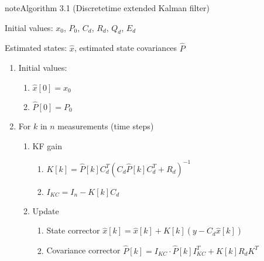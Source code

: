 \documentclass[review]{elsarticle}
\begin{document}
\begin{sphinxadmonition}{note}{Algorithm 3.1 (Discrete\sphinxhyphen{}time extended Kalman filter)}



\sphinxAtStartPar
{} Initial values: \(x_0\), \(P_0\), \(C_d\), \(R_d\), \(Q_d\), \(E_d\)

\sphinxAtStartPar
{} Estimated states: \(\hat{x}\), estimated state covariances \(\hat{P}\)
\begin{enumerate}
%
\item {} 
\sphinxAtStartPar
Initial values:
\begin{enumerate}
%
\item {} 
\sphinxAtStartPar
\(\hat{x}[0] = x_0\)

\item {} 
\sphinxAtStartPar
\(\hat{P}[0] = P_0\)

\end{enumerate}

\item {} 
\sphinxAtStartPar
For \(k\) in \(n\) measurements (time steps)
\begin{enumerate}
%
\item {} 
\sphinxAtStartPar
KF gain
\begin{enumerate}
%
\item {} 
\sphinxAtStartPar
\(K[k]=\hat{P}[k] C_d^T \left(C_d \hat{P}[k] C_d^T + R_d\right)^{-1}\)

\item {} 
\sphinxAtStartPar
\(I_{KC} = I_n - K[k] C_d\)

\end{enumerate}

\item {} 
\sphinxAtStartPar
Update
\begin{enumerate}
%
\item {} 
\sphinxAtStartPar
State corrector
\(\hat{x}[k] = \hat{x}[k] + K[k] (y - C_d \hat{x}[k]) \)

\item {} 
\sphinxAtStartPar
Covariance corrector
\(\hat{P}[k] = I_{KC} \cdot \hat{P}[k] I_{KC}^T + K[k] R_d K^T \)

\end{enumerate}


\end{enumerate}
\end{enumerate}
\end{sphinxadmonition}
\end{document}
